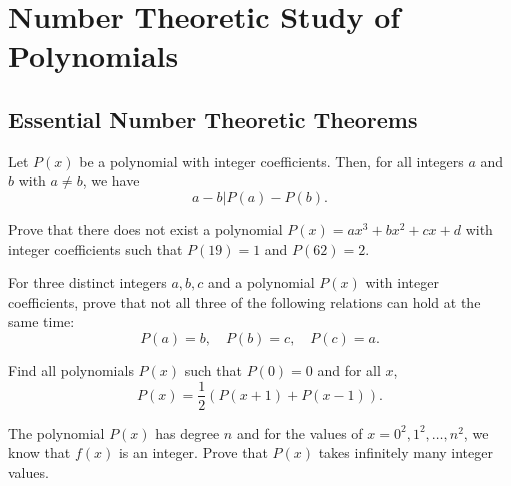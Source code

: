 \section{Number Theoretic Study of Polynomials}
\subsection{Essential Number Theoretic Theorems}
\begin{theorem}
Let $P(x)$ be a polynomial with integer coefficients. Then, for all integers $a$ and $b$ with $a\neq b$, we have \[a - b | P(a) - P(b).\]
\end{theorem}

\begin{question}[name={1962 Russia}]
    Prove that there does not exist a polynomial $P(x)=ax^3+bx^2+cx+d$ with integer coefficients such that $P(19)=1$ and $P(62)=2$.
\end{question}

\begin{question}[name={1974 USA}]
    For three distinct integers $a,b,c$ and a polynomial $P(x)$ with integer coefficients, prove that not all three of the following relations can hold at the same time:
    \[P(a)=b, \quad P(b)=c, \quad P(c)=a.\]
\end{question}



\begin{question}[name={1975 USA}]
    Find all polynomials $P(x)$ such that $P(0)=0$ and for all $x$,
    \[P(x)=\frac{1}{2}\left(P(x+1)+P(x-1)\right).\]
\end{question}

\begin{question}
    The polynomial $P(x)$ has degree $n$ and for the values of $x=0^2,1^2,\dots,n^2$, we know that $f(x)$ is an integer. Prove that $P(x)$ takes infinitely many integer values.
\end{question}

